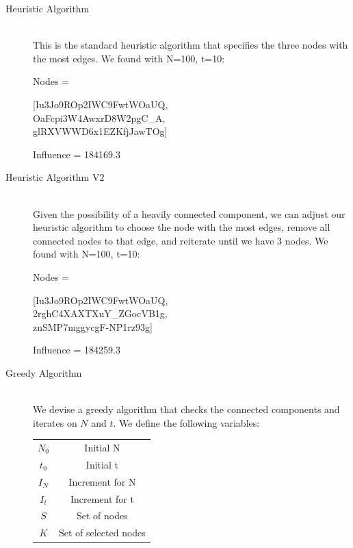 \documentclass{article}
\begin{document}
		\begin{description}
		\item[Heuristic Algorithm] \hfill \\
			This is the standard heuristic algorithm that specifies the three nodes with the most edges. We found with N=100, t=10:

			Nodes = \begin{center}
					[Iu3Jo9ROp2IWC9FwtWOaUQ,\\
					OaFcpi3W4AwxrD8W2pgC\_A,\\
 					glRXVWWD6x1EZKfjJawTOg]\\
			 		\end{center}

			 Influence = 184169.3

		\item[Heuristic Algorithm V2] \hfill \\
			Given the possibility of a heavily connected component, we can adjust our heuristic algorithm to choose the node with the most edges, remove all connected nodes to that edge, and reiterate until we have 3 nodes. We found with N=100, t=10:

			Nodes = \begin{center}
					[Iu3Jo9ROp2IWC9FwtWOaUQ,\\
 					2rghC4XAXTXuY\_ZGocVB1g,\\
 					znSMP7mggycgF-NP1rz93g]\\
			 		\end{center}

			 Influence = 184259.3

		\item[Greedy Algorithm] \hfill \\
			We devise a greedy algorithm that checks the connected components and iterates on $N$ and $t$. We define the following variables:

		    \begin{tabular}{|c|c|} 
		      \hline
		      $N_0$ & Initial N \\
		      $t_0$ & Initial t \\
		      $I_N$ & Increment for N \\
		      $I_t$ & Increment for t \\
		      $S$ & Set of nodes \\
		      $K$ & Set of selected nodes \\
		      \hline
		    \end{tabular}	


\end{description}
\end{document}
